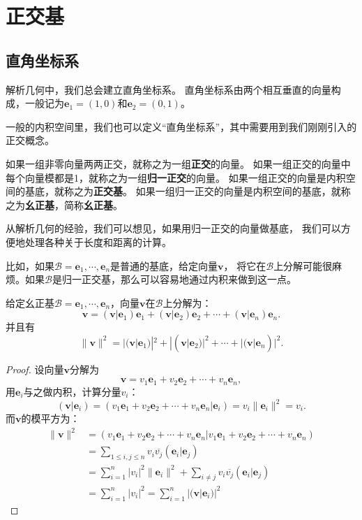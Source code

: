 \documentclass[12pt,UTF8,fontset=none]{ctexbook}
\begin{document}
\section{正交基}
\subsection{直角坐标系}
解析几何中，我们总会建立直角坐标系。
直角坐标系由两个相互垂直的向量构成，一般记为$\mathbf{e}_1 = (1,0)$和$\mathbf{e}_2 = (0,1)$。

一般的内积空间里，我们也可以定义“直角坐标系”，其中需要用到我们刚刚引入的正交概念。

如果一组非零向量两两正交，就称之为一组\textbf{正交}的向量。
如果一组正交的向量中每个向量模都是1，就称之为一组\textbf{归一正交}的向量。
如果一组正交的向量是内积空间的基底，就称之为\textbf{正交基}。
如果一组归一正交的向量是内积空间的基底，就称之为\textbf{幺正基}，简称\textbf{幺正基}。

从解析几何的经验，我们可以想见，如果用归一正交的向量做基底，
我们可以方便地处理各种关于长度和距离的计算。

比如，如果$\mathcal{B} = \mathbf{e}_1, \cdots , \mathbf{e}_n$是普通的基底，给定向量$\mathbf{v}$，
将它在$\mathcal{B}$上分解可能很麻烦。如果$\mathcal{B}$是归一正交基，那么可以容易地通过内积来做到这一点。

\begin{pp}\label{pp:7_3}
    给定幺正基$\mathcal{B} = \mathbf{e}_1, \cdots , \mathbf{e}_n$，向量$\mathbf{v}$在$\mathcal{B}$上分解为：
    $$\mathbf{v} = (\mathbf{v}|\mathbf{e}_1)\mathbf{e}_1 + (\mathbf{v}|\mathbf{e}_2)\mathbf{e}_2 + \cdots + (\mathbf{v}|\mathbf{e}_n)\mathbf{e}_n.$$
    并且有
    $$\|\mathbf{v}\|^2 = |(\mathbf{v}|\mathbf{e}_1)|^2 + |(\mathbf{v}|\mathbf{e}_2)|^2 + \cdots + |(\mathbf{v}|\mathbf{e}_n)|^2.$$
\end{pp}

\begin{proof} %
    设向量$\mathbf{v}$分解为
    $$ \mathbf{v} = v_1\mathbf{e}_1 + v_2\mathbf{e}_2 + \cdots + v_n \mathbf{e}_n, $$
    用$\mathbf{e}_i$与之做内积，计算分量$v_i$：
    $$ (\mathbf{v} | \mathbf{e}_i) = (v_1\mathbf{e}_1 + v_2\mathbf{e}_2 + \cdots + v_n \mathbf{e}_n | \mathbf{e}_i) = v_i \|\mathbf{e}_i\|^2 = v_i. $$
    而$\mathbf{v}$的模平方为：
    \begin{align*}
        \|\mathbf{v}\|^2 &=  (v_1\mathbf{e}_1 + v_2\mathbf{e}_2 + \cdots + v_n \mathbf{e}_n |v_1\mathbf{e}_1 + v_2\mathbf{e}_2 + \cdots + v_n \mathbf{e}_n)  \\
        &= \sum_{1 \leqslant i, j \leqslant n} v_i \overline{v_j} (\mathbf{e}_i | \mathbf{e}_j)  \\
        &= \sum_{i=1}^n | v_i|^2 \|\mathbf{e}_i \|^2 + \sum_{i \neq j} v_i \overline{v_j} (\mathbf{e}_i | \mathbf{e}_j)  \\
        &= \sum_{i=1}^n | v_i|^2 = \sum_{i=1}^n |(\mathbf{v} | \mathbf{e}_i)|^2 
    \end{align*}
\end{proof}
\end{document}
